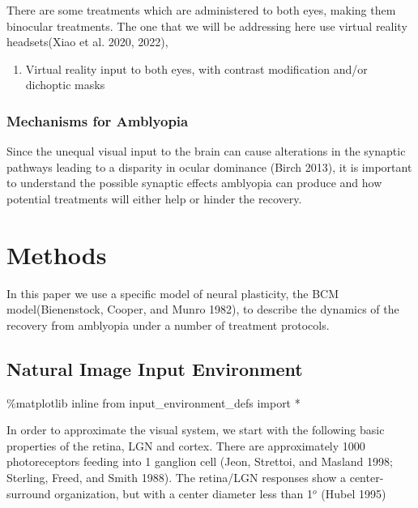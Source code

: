 \documentclass[
  letterpaper,
]{book}
\newenvironment{Shaded}{\begin{snugshade}}{\end{snugshade}}
\newcommand{\ImportTok}[1]{\textcolor[rgb]{0.00,0.46,0.62}{#1}}
\newcommand{\NormalTok}[1]{\textcolor[rgb]{0.00,0.23,0.31}{#1}}
\newcommand{\OperatorTok}[1]{\textcolor[rgb]{0.37,0.37,0.37}{#1}}
\providecommand{\tightlist}{%
  \setlength{\itemsep}{0pt}\setlength{\parskip}{0pt}}\usepackage{longtable,booktabs,array}
\begin{document}
There are some treatments which are administered to both eyes, making
them binocular treatments. The one that we will be addressing here use
virtual reality headsets(Xiao et al. 2020, 2022),

\begin{enumerate}
\def\labelenumi{\arabic{enumi}.}
\setcounter{enumi}{3}
\tightlist
\item
  Virtual reality input to both eyes, with contrast modification and/or
  dichoptic masks
\end{enumerate}

\hypertarget{mechanisms-for-amblyopia}{%
\section{Mechanisms for Amblyopia}\label{mechanisms-for-amblyopia}}

Since the unequal visual input to the brain can cause alterations in the
synaptic pathways leading to a disparity in ocular dominance (Birch
2013), it is important to understand the possible synaptic effects
amblyopia can produce and how potential treatments will either help or
hinder the recovery.

\part{Methods}

In this paper we use a specific model of neural plasticity, the BCM
model(Bienenstock, Cooper, and Munro 1982), to describe the dynamics of
the recovery from amblyopia under a number of treatment protocols.

\hypertarget{natural-image-input-environment}{%
\chapter{Natural Image Input
Environment}\label{natural-image-input-environment}}

\begin{Shaded}
\begin{Highlighting}[]
\OperatorTok{\%}\NormalTok{matplotlib inline}
\ImportTok{from}\NormalTok{ input\_environment\_defs }\ImportTok{import} \OperatorTok{*}
\end{Highlighting}
\end{Shaded}

In order to approximate the visual system, we start with the following
basic properties of the retina, LGN and cortex. There are approximately
1000 photoreceptors feeding into 1 ganglion cell (Jeon, Strettoi, and
Masland 1998; Sterling, Freed, and Smith 1988). The retina/LGN responses
show a center-surround organization, but with a center diameter less
than 1\(^o\) (Hubel 1995)
\end{document}

